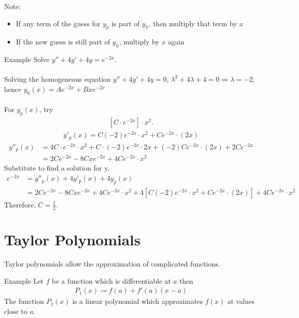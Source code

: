 \documentclass{report}
\begin{document}
			Note:
			\begin{itemize}
				\item If any term of the guess for $y_p$ is part of $y_h$, then multiply that term by $x$
				\item If the new guess is still part of $y_h$, multiply by $x$ again
			\end{itemize}

			\begin{question}{Example}
				Solve $y'' + 4y' + 4y = e^{-2x}$.
				\\ \\
				Solving the homogeneous equation $y'' + 4y' + 4y = 0$, $\lambda^2 + 4\lambda + 4 = 0 \Rightarrow \lambda = -2$, hence $y_h(x) = Ae^{-2x} + Bxe^{-2x}$
				\\ \\
				For $y_p(x)$, try
				\begin{align*}
					\left[C \cdot e^{-2x}\right] \cdot x^2.
				\end{align*}
				\begin{align*}
					y'_p(x) = C (-2) e^{-2x} \cdot x^2 + Ce^{-2x} \cdot (2x)
				\end{align*}
				\begin{align*}
					y''_p(x) &= 4C \cdot e^{-2x} \cdot x^2 + C \cdot (-2) e^{-2x} \cdot 2x + (-2) C e^{-2x} \cdot (2x) + 2Ce^{-2x}	\\
							 &= 2Ce^{-2x} - 8Cxe^{-2x} + 4Ce^{-2x}\cdot x^2
				\end{align*}
				Substitute to find a solution for y,
				\begin{align*}
					e^{-2x} &= y''_p(x) + 4 y'_p(x) + 4y_p(x)	\\
							&= 2Ce^{-2x} - 8Cxe^{-2x} + 4Ce^{-2x}\cdot x^2 + 4 \left[ C (-2) e^{-2x} \cdot x^2 + Ce^{-2x} \cdot (2x) \right] + 4Ce^{-2x} \cdot x^2
				\end{align*}
				Therefore, $C = \frac{1}{2}$.
				
			\end{question}

\chapter{Taylor Polynomials}

	Taylor polynomials allow the approximation of complicated functions.

	\begin{question}{Example}
		Let $f$ be a function which is differentiable at $a$ then
		\begin{align*}
			P_1(x) \coloneq f(a) + f'(a)(x - a)
		\end{align*}
		The function $P_1(x)$ is a linear polynomial which approximates $f(x)$ at values close to $a$.
	\end{question}
\end{document}
